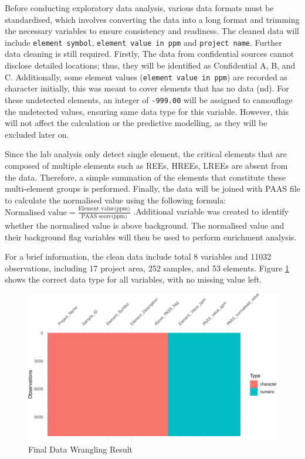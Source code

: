 \documentclass[11pt,a4paper,]{article}
\begin{document}
Before conducting exploratory data analysis, various data formats must be standardised, which involves converting the data into a long format and trimming the necessary variables to ensure consistency and readiness. The cleaned data will include \texttt{element\ symbol}, \texttt{element\ value\ in\ ppm} and \texttt{project\ name}. Further data cleaning is still required. Firstly, The data from confidential sources cannot disclose detailed locations; thus, they will be identified as Confidential A, B, and C. Additionally, some element values (\texttt{element\ value\ in\ ppm}) are recorded as character initially, this was meant to cover elements that has no data (nd). For these undetected elements, an integer of \texttt{-999.00} will be assigned to camouflage the undetected values, ensuring same data type for this variable. However, this will not affect the calculation or the predictive modelling, as they will be excluded later on.

Since the lab analysis only detect single element, the critical elements that are composed of multiple elements such as REEs, HREEs, LREEs are absent from the data. Therefore, a simple summation of the elements that constitute these multi-element groups is performed. Finally, the data will be joined with PAAS file to calculate the normalised value using the following formula: \(\text{Normalised value}= \frac{\text{Element value(ppm)}}{\text{PAAS score(ppm)}}\) .Additional variable was created to identify whether the normalised value is above background. The normalised value and their background flag variables will then be used to perform enrichment analysis.

For a brief information, the clean data include total 8 variables and 11032 observations, including 17 project area, 252 samples, and 53 elements. Figure \ref{fig:visdat} shows the correct data type for all variables, with no missing value left.

\begin{figure}
\centering
\includegraphics{Final_report_files/figure-latex/visdat-1.pdf}
\caption{\label{fig:visdat}Final Data Wrangling Result}
\end{figure}
\end{document}
